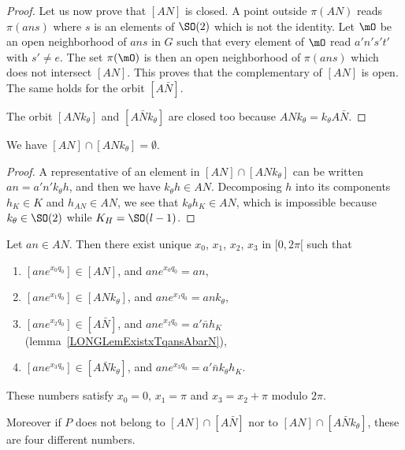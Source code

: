 \begin{proof}
    Let us now prove that $[AN]$ is closed. A point outside $\pi(AN)$ reads $\pi(ans)$ where $s$ is an elements of $\SO(2)$ which is not the identity. Let $\mO$ be an open neighborhood of $ans$ in $G$ such that every element of $\mO$ read $a'n's't'$ with $s'\neq e$. The set $\pi(\mO)$ is then an open neighborhood of $\pi(ans)$ which does not intersect $[AN]$. This proves that the complementary of $[AN]$ is open. The same holds for the orbit $[A\bar N]$.

    The orbit $[ANk_{\theta}]$ and $[A\bar Nk_{\theta}]$ are closed too because $ANk_{\theta}=k_{\theta}A\bar N$.

\end{proof}

%
\begin{lemma}
    We have $[AN]\cap[ANk_{\theta}]=\emptyset$.
\end{lemma}

\begin{proof}
    A representative of an element in $[AN]\cap[ANk_{\theta}]$ can be written $an=a'n'k_{\theta}h$, and then we have $k_{\theta}h\in AN$. Decomposing $h$ into its components $h_K\in K$ and $h_{AN}\in AN$, we see that $k_{\theta}h_K\in AN$, which is impossible because $k_{\theta}\in\SO(2)$ while $K_H=\SO(l-1)$.
\end{proof}

\begin{proposition}        \label{LONGPropUniquexxxxANANbarktheta}
    Let $an\in AN$. Then there exist unique $x_0$, $x_1$, $x_2$, $x_3$ in $\mathopen[ 0 , 2\pi [$ such that
    \begin{enumerate}
        \item
            $[an e^{x_0q_0}]\in[AN]$, and $an e^{x_0q_0}=an$,
        \item
            $[an e^{x_1q_0}]\in[ANk_{\theta}]$, and $an e^{x_1q_0}=ank_{\theta}$,
        \item
            $[an e^{x_2q_0}]\in[A\bar N]$, and $an e^{x_2q_0}=a'\bar n h_K$ (lemma~\ref{LONGLemExistxTqansAbarN}),
        \item
            $[an e^{x_3q_0}]\in[A\bar Nk_{\theta}]$, and $an e^{x_3q_0}=a'\bar nk_{\theta}h_K$.
    \end{enumerate}
    These numbers satisfy $x_0=0$, $x_1=\pi$ and $x_3=x_2+\pi$ modulo $2\pi$.

    Moreover if $P$ does not belong to $[AN]\cap[A\bar N]$ nor to $[AN]\cap[A\bar Nk_{\theta}]$, these are four different numbers.
\end{proposition}

